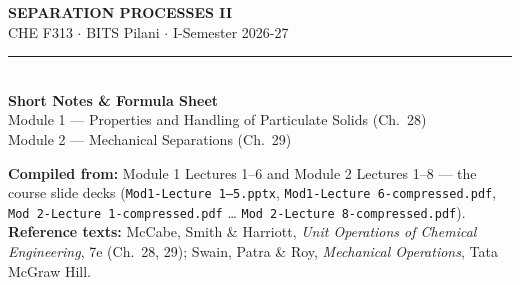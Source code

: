 \documentclass[10pt,a4paper]{article}
\newenvironment{daybox}{%
  \par\addvspace{4pt}\noindent\begin{lrbox}{\spboxa}%
  \begin{minipage}{\dimexpr\linewidth-12pt\relax}\small\color{notecol}%
}{\end{minipage}\end{lrbox}%
  \fcolorbox{boxframe}{white}{\usebox{\spboxa}}\par\addvspace{6pt}}
\providecommand{\textperiodcentered}{\ensuremath{\cdot}}
\begin{document}
\begin{center}
{\LARGE\bfseries\color{accent} SEPARATION PROCESSES II}\\[2pt]
{\color{accent2} CHE F313 \textperiodcentered{} BITS Pilani \textperiodcentered{} I-Semester 2026-27}\\[4pt]
{\color{rule}\rule{0.6\linewidth}{0.8pt}}\\[6pt]
{\Large\bfseries\color{accent} Short Notes \& Formula Sheet}\\[4pt]
{\color{accent2} Module 1 --- Properties and Handling of Particulate Solids (Ch.~28)\\
 Module 2 --- Mechanical Separations (Ch.~29)}
\end{center}

\vspace{2mm}
\begin{daybox}
\textbf{Compiled from:} Module 1 Lectures 1--6 and Module 2 Lectures 1--8 --- the course slide decks (\texttt{Mod1-Lecture 1--5.pptx}, \texttt{Mod1-Lecture 6-compressed.pdf}, \texttt{Mod 2-Lecture 1-compressed.pdf} \dots{} \texttt{Mod 2-Lecture 8-compressed.pdf}).\\[2pt]
\textbf{Reference texts:} McCabe, Smith \& Harriott, \emph{Unit Operations of Chemical Engineering}, 7e (Ch.~28, 29); Swain, Patra \& Roy, \emph{Mechanical Operations}, Tata McGraw Hill.
\end{daybox}
\end{document}
